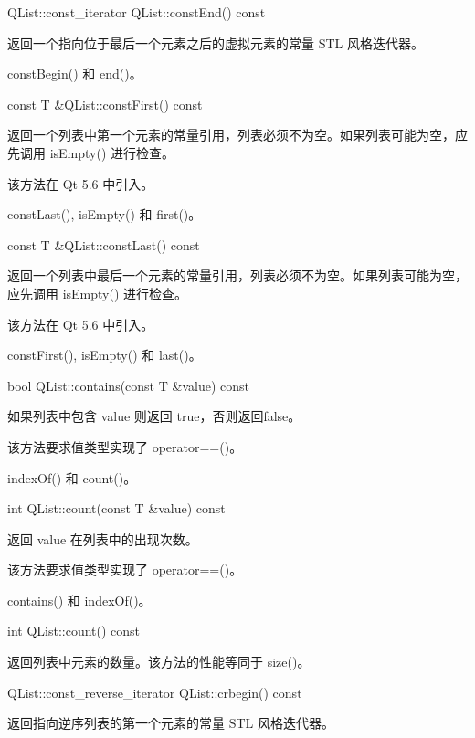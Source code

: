 QList::const\_iterator QList::constEnd() const

返回一个指向位于最后一个元素之后的虚拟元素的常量 STL 风格迭代器。




\begin{seeAlso}
constBegin() 和 end()。
\end{seeAlso}


const T \&QList::constFirst() const

返回一个列表中第一个元素的常量引用，列表必须不为空。如果列表可能为空，应先调用 isEmpty() 进行检查。

该方法在 Qt 5.6 中引入。

\begin{seeAlso}
constLast(), isEmpty() 和 first()。
\end{seeAlso}


const T \&QList::constLast() const

返回一个列表中最后一个元素的常量引用，列表必须不为空。如果列表可能为空，应先调用 isEmpty() 进行检查。

该方法在 Qt 5.6 中引入。




\begin{seeAlso}
constFirst(), isEmpty() 和 last()。
\end{seeAlso}


bool QList::contains(const T \&value) const

如果列表中包含 value 则返回 true，否则返回false。

该方法要求值类型实现了 operator==()。

\begin{seeAlso}
indexOf() 和 count()。
\end{seeAlso}

int QList::count(const T \&value) const

返回 value 在列表中的出现次数。

该方法要求值类型实现了 operator==()。



\begin{seeAlso}
contains() 和 indexOf()。
\end{seeAlso}


int QList::count() const

返回列表中元素的数量。该方法的性能等同于 size()。

QList::const\_reverse\_iterator QList::crbegin() const

返回指向逆序列表的第一个元素的常量 STL 风格迭代器。

